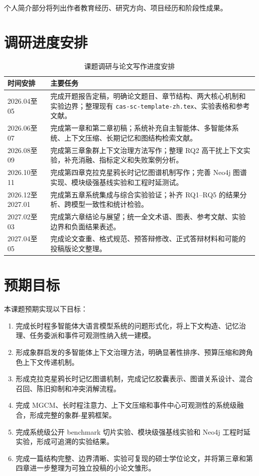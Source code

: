 \documentclass[UTF8,a4paper,zihao=-4,fontset=windows]{ctexart}
\newcommand{\framework}{象群-星鸦框架}
\begin{document}
个人简介部分将列出作者教育经历、研究方向、项目经历和阶段性成果。

\section{调研进度安排}

\begin{longtable}{>{\raggedright\arraybackslash}p{}>{\raggedright\arraybackslash}p{}}
  \caption{课题调研与论文写作进度安排}\\
  \toprule
  时间安排 & 主要任务\\
  \midrule
  2026.04至05 & 完成开题报告定稿，明确论文题目、章节结构、两大核心机制和实验边界；整理现有 \texttt{cas-sc-template-zh.tex}、实验表格和参考文献。\\
  2026.06至07 & 完成第一章和第二章初稿；系统补充自主智能体、多智能体系统、上下文压缩、长期记忆和图结构检索文献。\\
  2026.08至09 & 完成第三章象群上下文治理方法写作；整理 RQ2 高干扰上下文实验，补充消融、指标定义和失败案例分析。\\
  2026.10至11 & 完成第四章克拉克星鸦长时记忆图谱机制写作；完善 Neo4j 图谱实现、模块级强基线实验和工程时延测试。\\
  2026.12至2027.01 & 完成第五章系统集成与综合实验验证；补齐 RQ1--RQ5 的结果分析、跨模型一致性和统计检验。\\
  2027.02至03 & 完成第六章结论与展望；统一全文术语、图表、参考文献、实验边界和负面结果表述。\\
  2027.04至05 & 完成论文查重、格式规范、预答辩修改、正式答辩材料和可能的投稿版论文整理。\\
  \bottomrule
\end{longtable}

\section{预期目标}

本课题预期实现以下目标：

\begin{enumerate}[label=\arabic*.]
  \item 完成长时程多智能体大语言模型系统的问题形式化，将上下文构造、记忆治理、任务委派和事件可观测性纳入统一建模。
  \item 形成象群启发的多智能体上下文治理方法，明确显著性排序、预算压缩和跨角色上下文传递机制。
  \item 形成克拉克星鸦长时记忆图谱机制，完成记忆胶囊表示、图谱关系设计、混合召回、陈旧抑制和冲突消解流程。
  \item 完成 MGCM、长时程注意力、上下文压缩和事件中心可观测性的系统级融合，形成完整的\framework。
  \item 完成系统级公开 benchmark 切片实验、模块级强基线实验和 Neo4j 工程时延实验，形成可追溯的实验结果。
  \item 完成一篇结构完整、边界清晰、实验可复现的硕士学位论文，并将第三章和第四章进一步整理为可独立投稿的小论文雏形。
\end{enumerate}
\end{document}
